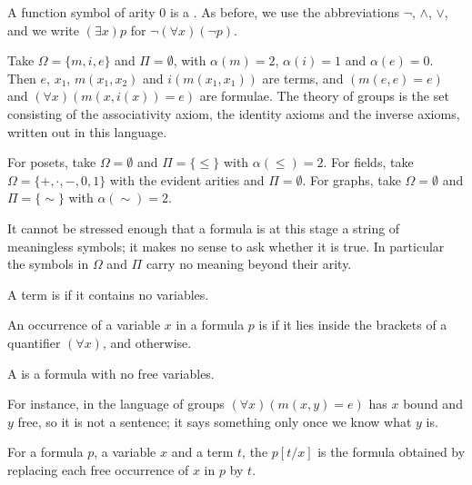 A function symbol of arity $0$ is a . As before, we use the abbreviations $\lnot$, $\land$, $\lor$, and we write $(\exists x) p$ for $\lnot (\forall x)(\lnot p)$.

\begin{example}
  Take $\Omega = \{m, i, e\}$ and $\Pi = \emptyset$, with $\alpha(m) = 2$, $\alpha(i) = 1$ and $\alpha(e) = 0$. Then $e$, $x_1$, $m(x_1, x_2)$ and $i(m(x_1,x_1))$ are terms, and $(m(e, e) = e)$ and $(\forall x)(m(x, i(x)) = e)$ are formulae. The theory of groups is the set consisting of the associativity axiom, the identity axioms and the inverse axioms, written out in this language.
\end{example}

\begin{example}
  For posets, take $\Omega = \emptyset$ and $\Pi = \{\leq\}$ with $\alpha(\leq) = 2$. For fields, take $\Omega = \{+, \cdot, -, 0, 1\}$ with the evident arities and $\Pi = \emptyset$. For graphs, take $\Omega = \emptyset$ and $\Pi = \{\sim\}$ with $\alpha(\sim) = 2$.
\end{example}

It cannot be stressed enough that a formula is at this stage a string of meaningless symbols; it makes no sense to ask whether it is true. In particular the symbols in $\Omega$ and $\Pi$ carry no meaning beyond their arity.

\begin{definition}
  A term is  if it contains no variables.
\end{definition}

\begin{definition}
  An occurrence of a variable $x$ in a formula $p$ is  if it lies inside the brackets of a quantifier $(\forall x)$, and  otherwise.
\end{definition}

\begin{definition}[Sentence]
  A  is a formula with no free variables.
\end{definition}

For instance, in the language of groups $(\forall x)(m(x, y) = e)$ has $x$ bound and $y$ free, so it is not a sentence; it says something only once we know what $y$ is.

\begin{definition}[Substitution]
  For a formula $p$, a variable $x$ and a term $t$, the  $p[t/x]$ is the formula obtained by replacing each free occurrence of $x$ in $p$ by $t$.
\end{definition}

